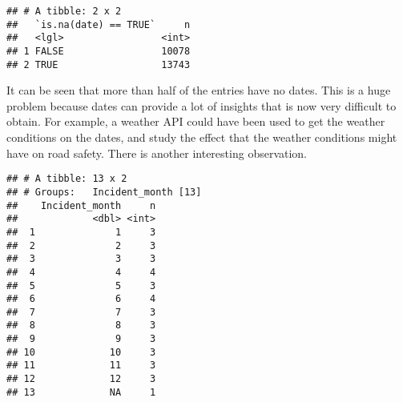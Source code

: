\documentclass[
]{book}
\newenvironment{Shaded}{\begin{snugshade}}{\end{snugshade}}
\newcommand{\DataTypeTok}[1]{\textcolor[rgb]{0.13,0.29,0.53}{#1}}
\newcommand{\KeywordTok}[1]{\textcolor[rgb]{0.13,0.29,0.53}{\textbf{#1}}}
\newcommand{\NormalTok}[1]{#1}
\newcommand{\OperatorTok}[1]{\textcolor[rgb]{0.81,0.36,0.00}{\textbf{#1}}}
\newcommand{\OtherTok}[1]{\textcolor[rgb]{0.56,0.35,0.01}{#1}}
\newcommand{\StringTok}[1]{\textcolor[rgb]{0.31,0.60,0.02}{#1}}
\begin{document}
\begin{Shaded}
\end{Shaded}

\begin{verbatim}
## # A tibble: 2 x 2
##   `is.na(date) == TRUE`     n
##   <lgl>                 <int>
## 1 FALSE                 10078
## 2 TRUE                  13743
\end{verbatim}

It can be seen that more than half of the entries have no dates. This is a huge problem because dates can provide a lot of insights that is now very difficult to obtain. For example, a weather API could have been used to get the weather conditions on the dates, and study the effect that the weather conditions might have on road safety. There is another interesting observation.

\begin{Shaded}
\end{Shaded}

\begin{verbatim}
## # A tibble: 13 x 2
## # Groups:   Incident_month [13]
##    Incident_month     n
##             <dbl> <int>
##  1              1     3
##  2              2     3
##  3              3     3
##  4              4     4
##  5              5     3
##  6              6     4
##  7              7     3
##  8              8     3
##  9              9     3
## 10             10     3
## 11             11     3
## 12             12     3
## 13             NA     1
\end{verbatim}
\end{document}
